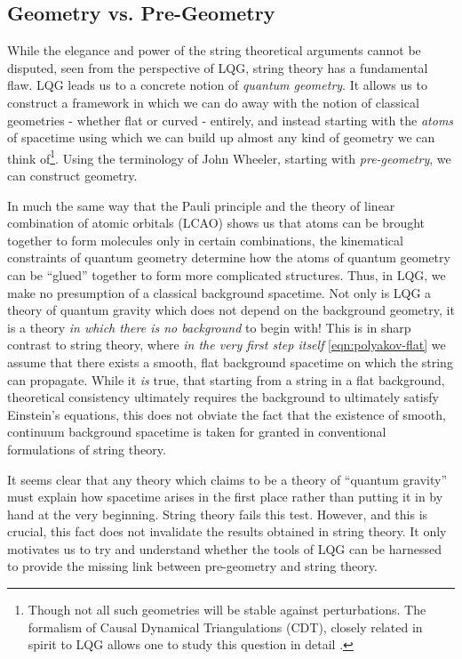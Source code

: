 \documentclass[submission, Phys]{SciPost}
\begin{document}
\subsection{Geometry vs. Pre-Geometry}\label{sec:pregeom-1}

While the elegance and power of the string theoretical arguments cannot be disputed, seen from the perspective of LQG, string theory has a fundamental flaw. LQG leads us to a concrete notion of \emph{quantum geometry}. It allows us to construct a framework in which we can do away with the notion of classical geometries - whether flat or curved - entirely, and instead starting with the \emph{atoms} of spacetime \cite{Krasnov2009Black,Rovelli2006A-semiclassical} using which we can build up almost any kind of geometry we can think of\footnote{Though not all such geometries will be stable against perturbations. The formalism of Causal Dynamical Triangulations (CDT), closely related in spirit to LQG allows one to study this question in detail \cite{Ambjorn2013Quantum}.}. Using the terminology of John Wheeler, starting with \emph{pre-geometry}, we can construct geometry.

In much the same way that the Pauli principle and the theory of linear combination of atomic orbitals (LCAO) shows us that atoms can be brought together to form molecules only in certain combinations, the kinematical constraints of quantum geometry determine how the atoms of quantum geometry can be ``glued'' together to form more complicated structures. Thus, in LQG, we make no presumption of a classical background spacetime. Not only is LQG a theory of quantum gravity which does not depend on the background geometry, it is a theory \emph{in which there is no background} to begin with! This is in sharp contrast to string theory, where \emph{in the very first step itself} \eqref{eqn:polyakov-flat} we assume that there exists a smooth, flat background spacetime on which the string can propagate. While it \emph{is} true, that starting from a string in a flat background, theoretical consistency ultimately requires the background to ultimately satisfy Einstein's equations, this does not obviate the fact that the existence of smooth, continuum background spacetime is taken for granted in conventional formulations of string theory.

It seems clear that any theory which claims to be a theory of ``quantum gravity'' must explain how spacetime arises in the first place rather than putting it in by hand at the very beginning. String theory fails this test. However, and this is crucial, this fact does not invalidate the results obtained in string theory. It only motivates us to try and understand whether the tools of LQG can be harnessed to provide the missing link between pre-geometry and string theory.
\end{document}
